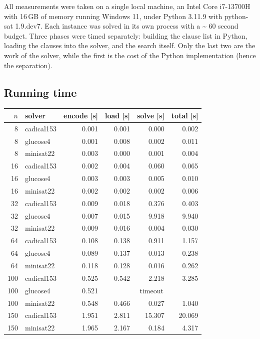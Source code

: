 \documentclass[11pt,a4paper]{article}
\begin{document}
All measurements were taken on a single local machine, an Intel Core
i7-13700H with 16\,GB of memory running Windows 11, under Python 3.11.9
with python-sat 1.9.dev7. Each instance was solved in its own process with a
\textasciitilde{} 60 second budget. Three phases were timed separately: building the clause
list in Python, loading the clauses into the solver, and the search itself.
Only the last two are the work of the solver, while the first is the cost of the Python implementation (hence the separation).

\subsection*{Running time}

\begin{table}[H]
\centering
\begin{tabular}{rlrrrr}
\toprule
$n$ & solver & encode [s] & load [s] & solve [s] & total [s] \\
\midrule
8   & cadical153 & 0.001 & 0.001 & 0.000 & 0.002 \\
8   & glucose4   & 0.001 & 0.008 & 0.002 & 0.011 \\
8   & minisat22  & 0.003 & 0.000 & 0.001 & 0.004 \\
16  & cadical153 & 0.002 & 0.004 & 0.060 & 0.065 \\
16  & glucose4   & 0.003 & 0.003 & 0.005 & 0.010 \\
16  & minisat22  & 0.002 & 0.002 & 0.002 & 0.006 \\
32  & cadical153 & 0.009 & 0.018 & 0.376 & 0.403 \\
32  & glucose4   & 0.007 & 0.015 & 9.918 & 9.940 \\
32  & minisat22  & 0.009 & 0.016 & 0.004 & 0.030 \\
64  & cadical153 & 0.108 & 0.138 & 0.911 & 1.157 \\
64  & glucose4   & 0.089 & 0.137 & 0.013 & 0.238 \\
64  & minisat22  & 0.118 & 0.128 & 0.016 & 0.262 \\
100 & cadical153 & 0.525 & 0.542 & 2.218 & 3.285 \\
100 & glucose4   & 0.521 & \multicolumn{3}{c}{timeout} \\
100 & minisat22  & 0.548 & 0.466 & 0.027 & 1.040 \\
150 & cadical153 & 1.951 & 2.811 & 15.307 & 20.069 \\
150 & minisat22  & 1.965 & 2.167 & 0.184 & 4.317 \\

\end{tabular}
\end{table}
\end{document}
